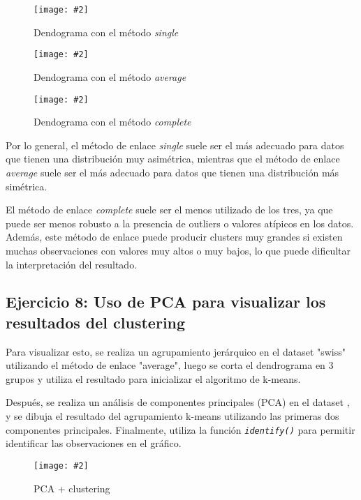 \documentclass[
12pt, 
spanish, 
singlespacing,
headsepline
]{article}
\newcommand{\smallimage}[2]{
\begin{figure}[H]
	\caption{#1}
	\centering
	\texttt{[image: \#2]}
\end{figure}
}
\newcommand{\code}[1]{\textit{\texttt{#1}}}
\begin{document}
\smallimage{Dendograma con el método \emph{single}}{R/cluster_dendogram.png}
\smallimage{Dendograma con el método \emph{average}}{R/cluster_average.png}
\smallimage{Dendograma con el método \emph{complete}}{R/cluster_complete.png}

Por lo general, el método de enlace \emph{single} suele ser el más adecuado para datos que tienen una distribución muy asimétrica, mientras que el método de enlace \emph{average} suele ser el más adecuado para datos que tienen una distribución más simétrica. 

El método de enlace \emph{complete} suele ser el menos utilizado de los tres, ya que puede ser menos robusto a la presencia de outliers o valores atípicos en los datos. Además, este método de enlace puede producir clusters muy grandes si existen muchas observaciones con valores muy altos o muy bajos, lo que puede dificultar la interpretación del resultado.

\subsection{Ejercicio 8: Uso de PCA para visualizar los resultados del clustering}
Para visualizar esto, se realiza un agrupamiento jerárquico en el dataset "swiss" utilizando el método de enlace "average", luego se corta el dendrograma en 3 grupos y utiliza el resultado para inicializar el algoritmo de k-means. 

Después, se realiza un análisis de componentes principales (PCA) en el dataset , y se dibuja el resultado del agrupamiento k-means utilizando las primeras dos componentes principales. Finalmente, utiliza la función \code{identify()} para permitir identificar las observaciones en el gráfico.

\smallimage{PCA + clustering}{R/swiss_pca.png}
\end{document}
